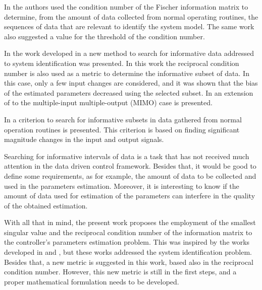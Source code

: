 \documentclass[letterpaper, 10 pt, conference]{ieeeconf}  %
\begin{document}
In \cite{shardt2013data} the authors used the condition number of the Fischer information matrix to determine, from the amount of data collected from normal operating routines, the sequences of data that are relevant to identify the system model.
The same work also suggested a value for the threshold of the condition number.

In the work developed in \cite{arengas2017searching} a new method to search for informative data addressed to system identification was presented.
In this work the reciprocal condition number is also used as a metric to determine the informative subset of data.
In this case, only a few input changes are considered, and it was shown that the bias of the estimated parameters decreased using the selected subset.
In \cite{arengas2017search} an extension of \cite{arengas2017searching} to the multiple-input multiple-output (MIMO) case is presented.

In \cite{wang2018searching} a criterion to search for informative subsets in data gathered from normal operation routines is presented.
This criterion is based on finding significant magnitude changes in the input and output signals.

Searching for informative intervals of data is a task that has not received much attention in the data driven control framework.
Besides that, it would be good to define some requirements, as for example, the amount of data to be collected and used in the parameters estimation.
Moreover, it is interesting to know if the amount of data used for estimation of the parameters can interfere in the quality of the obtained estimation.

With all that in mind, the present work proposes the employment of the smallest singular value and the reciprocal condition number of the information matrix to the controller's parameters estimation problem.
This was inspired by the works developed in \cite{carrette1996discarding} and \cite{bittencourt2015algorithm}, but these works addressed the system identification problem.
Besides that, a new metric is suggested in this work, based also in the reciprocal condition number.
However, this new metric is still in the first steps, and a proper mathematical formulation needs to be developed.
\end{document}
